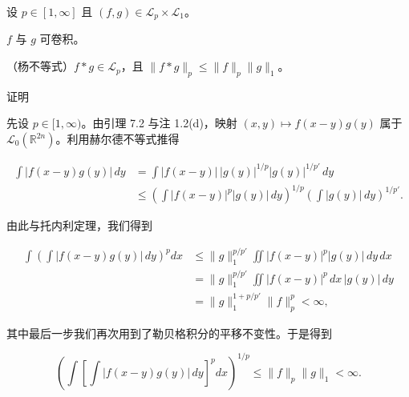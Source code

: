 \begin{theorem}

设 $ p \in [1,\infty] $ 且 $ (f,g) \in \mathcal{L}_{p} \times \mathcal{L}_{1} $。

\begin{subitems}
\item

$ f $ 与 $ g $ 可卷积。

\item

（杨不等式）$ f * g \in \mathcal{L}_{p} $，且 $ \|f * g\|_{p} \le \|f\|_{p}\|g\|_{1} $。

\end{subitems}

证明

\begin{items}
\item

先设 $ p \in [1,\infty) $。由引理 7.2 与注 1.2(d)，映射 $ (x,y) \mapsto f(x-y)g(y) $ 属于 $ \mathcal{L}_{0}(\mathbb{R}^{2n}) $。利用赫尔德不等式推得

\begin{equation*}
\begin{aligned}
\int |f(x-y)g(y)|\,dy &= \int |f(x-y)|\,|g(y)|^{1/p}|g(y)|^{1/p'}\,dy \\ &\le \left(\int |f(x-y)|^{p}|g(y)|\,dy\right)^{1/p}\left(\int |g(y)|\,dy\right)^{1/p'} .
\end{aligned}
\end{equation*}

由此与托内利定理，我们得到

\begin{equation*}
\begin{aligned}
\int \left(\int |f(x-y)g(y)|\,dy\right)^{p} dx &\le \|g\|_{1}^{p/p'}\iint |f(x-y)|^{p}|g(y)|\,dy\,dx \\ &= \|g\|_{1}^{p/p'}\iint |f(x-y)|^{p}\,dx\,|g(y)|\,dy \\ &= \|g\|_{1}^{1+p/p'}\|f\|_{p}^{p} < \infty ,
\end{aligned}
\end{equation*}

其中最后一步我们再次用到了勒贝格积分的平移不变性。于是得到

\begin{equation}
\left(\int \left[\int |f(x-y)g(y)|\,dy\right]^{p} dx\right)^{1/p} \le \|f\|_{p}\|g\|_{1} < \infty .\tag{7.3}
\end{equation}


\end{items}
\end{theorem}
